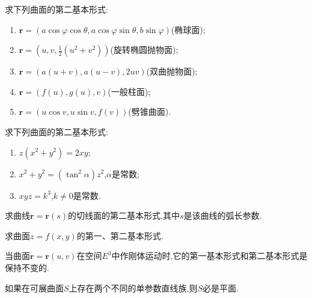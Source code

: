 \documentclass[../../main.tex]{subfiles}%
\begin{document}
\begin{example}
求下列曲面的第二基本形式:
\begin{enumerate}[(1)]
\item $\bm{r} = (a\cos\varphi\cos\theta,a\cos\varphi\sin\theta,b\sin\varphi)$(椭球面);
\item $\bm{r} = \left(u,v,\frac{1}{2}(u^2+v^2)\right)$(旋转椭圆抛物面);
\item $\bm{r} = (a(u+v),a(u-v),2uv)$(双曲抛物面);
\item $\bm{r} = (f(u),g(u),v)$(一般柱面);
\item $\bm{r} = (u\cos v,u\sin v,f(v))$(劈锥曲面).
\end{enumerate}
\end{example}

\begin{example}
求下列曲面的第二基本形式:
\begin{enumerate}[(1)]
\item $z(x^2+y^2)=2xy$;
\item $x^2+y^2=(\tan^2\alpha)z^2$,$\alpha$是常数;
\item $xyz=k^3$,$k\neq0$是常数.
\end{enumerate}
\end{example}

\begin{example}
求曲线$\bm{r}=\bm{r}(s)$的切线面的第二基本形式,其中$s$是该曲线的弧长参数.
\end{example}

\begin{example}
求曲面$z=f(x,y)$的第一、第二基本形式.
\end{example}

\begin{example}
当曲面$\bm{r}=\bm{r}(u,v)$在空间$E^3$中作刚体运动时,它的第一基本形式和第二基本形式是保持不变的.
\end{example}

\begin{example}
如果在可展曲面$S$上存在两个不同的单参数直线族,则$S$必是平面.
\end{example}
\end{document}
